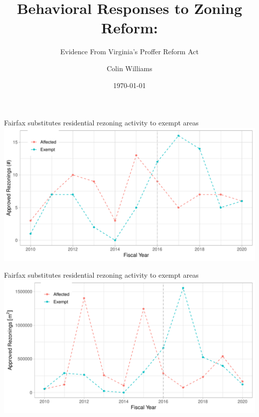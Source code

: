 \documentclass[10pt]{beamer}
\title{Behavioral Responses to Zoning Reform:}
\subtitle{Evidence From Virginia's Proffer Reform Act}
\date{\today}
\author{Colin Williams}
\institute{University of Virginia}
\begin{document}
\maketitle

\begin{frame}{Fairfax substitutes residential rezoning activity to exempt areas}
    \includegraphics[width=\textwidth]{figures/fairfax/plot_fairfax_exempt_counts.pdf}
\end{frame}

\begin{frame}{Fairfax substitutes residential rezoning activity to exempt areas}
    \includegraphics[width=\textwidth]{figures/fairfax/plot_fairfax_exempt_areas.pdf}
\end{frame}
\end{document}
